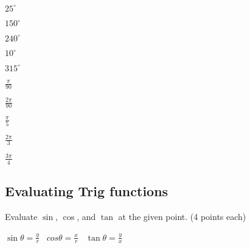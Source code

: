 \documentclass[12pt]{article}
\begin{document}
\begin{enumerate}[resume]
\begin{multicols}{2}

\item $25^\circ$\\

\item $150^\circ$\\

\item $240^\circ$\\

\item $10^\circ$\\

\item $315^\circ$\\

\columnbreak

\item $\frac{\pi}{90}$\\

\item $\frac{2\pi}{90}$\\

\item $\frac{\pi}{5}$\\

\item $\frac{2\pi}{3}$\\

\item $\frac{3\pi}{4}$\\

\end{multicols}
\end{enumerate}


\pagebreak

\subsection*{Evaluating Trig functions}

Evaluate $\sin$, $\cos$, and $\tan$ at the given point. (4 points each)\\

\begin{center}
$\sin\theta=\frac{y}{r}$ \ $cos\theta=\frac{x}{r}$ \ $\tan\theta=\frac{y}{x}$\\
\end{center}

\vspace{12pt}
\end{document}
